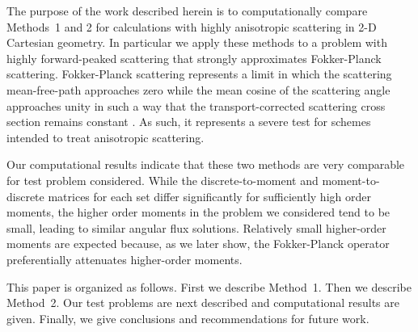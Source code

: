 \documentclass[12pt]{article}
\begin{document}
\begin{center}
The purpose of the work described herein is to computationally compare Methods~1 and 2 for calculations with highly anisotropic   
scattering in 2-D Cartesian geometry.  In particular we apply these methods to a problem with highly forward-peaked scattering that 
strongly approximates Fokker-Planck scattering.  Fokker-Planck scattering represents a limit in which the scattering mean-free-path 
approaches zero while the mean cosine of the scattering angle approaches unity in such a way that the transport-corrected scattering 
cross section remains constant \cite{FP}.  As such, it represents a severe test for schemes intended to treat anisotropic scattering.  

Our computational results indicate that these two methods are very comparable for test problem considered.  While the discrete-to-moment and moment-to-discrete matrices for each set differ significantly for sufficiently high order moments, the higher order moments in the problem we considered 
tend to be small, leading to similar angular flux solutions.  Relatively small higher-order moments are expected because, as we later show, 
the Fokker-Planck operator preferentially attenuates higher-order moments.  

This paper is organized as follows.  First we describe Method~1.  Then we describe Method~2.  Our test problems are next described and computational results are given.  Finally, we give conclusions and recommendations for future work.





\end{center}
\end{document}
